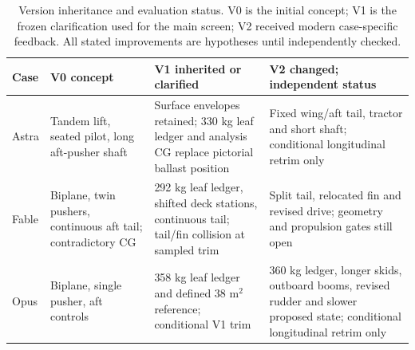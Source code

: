 \documentclass[11pt,a4paper]{article}
\begin{document}
\begin{table}[H]\centering\footnotesize
\caption{Version inheritance and evaluation status. V0 is the initial concept; V1 is the frozen clarification used for the main screen; V2 received modern case-specific feedback. All stated improvements are hypotheses until independently checked.}\label{tab:stage}
\begin{tabularx}{\linewidth}{lXXX}\toprule
Case & V0 concept & V1 inherited or clarified & V2 changed; independent status\\\midrule
Astra & Tandem lift, seated pilot, long aft-pusher shaft & Surface envelopes retained; 330 kg leaf ledger and analysis CG replace pictorial ballast position & Fixed wing/aft tail, tractor and short shaft; conditional longitudinal retrim only\\
Fable & Biplane, twin pushers, continuous aft tail; contradictory CG & 292 kg leaf ledger, shifted deck stations, continuous tail; tail/fin collision at sampled trim & Split tail, relocated fin and revised drive; geometry and propulsion gates still open\\
Opus & Biplane, single pusher, aft controls & 358 kg leaf ledger and defined 38 m$^2$ reference; conditional V1 trim & 360 kg ledger, longer skids, outboard booms, revised rudder and slower proposed state; conditional longitudinal retrim only\\\bottomrule
\end{tabularx}
\end{table}
\end{document}
